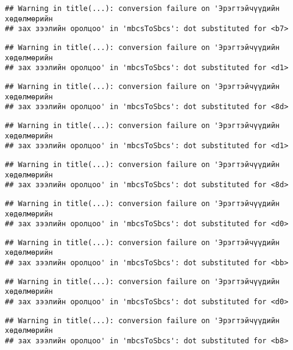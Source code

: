 \documentclass[]{article}
\begin{document}
\begin{verbatim}
## Warning in title(...): conversion failure on 'Эрэгтэйчүүдийн хөдөлмөрийн
## зах зээлийн оролцоо' in 'mbcsToSbcs': dot substituted for <b7>
\end{verbatim}

\begin{verbatim}
## Warning in title(...): conversion failure on 'Эрэгтэйчүүдийн хөдөлмөрийн
## зах зээлийн оролцоо' in 'mbcsToSbcs': dot substituted for <d1>
\end{verbatim}

\begin{verbatim}
## Warning in title(...): conversion failure on 'Эрэгтэйчүүдийн хөдөлмөрийн
## зах зээлийн оролцоо' in 'mbcsToSbcs': dot substituted for <8d>
\end{verbatim}

\begin{verbatim}
## Warning in title(...): conversion failure on 'Эрэгтэйчүүдийн хөдөлмөрийн
## зах зээлийн оролцоо' in 'mbcsToSbcs': dot substituted for <d1>
\end{verbatim}

\begin{verbatim}
## Warning in title(...): conversion failure on 'Эрэгтэйчүүдийн хөдөлмөрийн
## зах зээлийн оролцоо' in 'mbcsToSbcs': dot substituted for <8d>
\end{verbatim}

\begin{verbatim}
## Warning in title(...): conversion failure on 'Эрэгтэйчүүдийн хөдөлмөрийн
## зах зээлийн оролцоо' in 'mbcsToSbcs': dot substituted for <d0>
\end{verbatim}

\begin{verbatim}
## Warning in title(...): conversion failure on 'Эрэгтэйчүүдийн хөдөлмөрийн
## зах зээлийн оролцоо' in 'mbcsToSbcs': dot substituted for <bb>
\end{verbatim}

\begin{verbatim}
## Warning in title(...): conversion failure on 'Эрэгтэйчүүдийн хөдөлмөрийн
## зах зээлийн оролцоо' in 'mbcsToSbcs': dot substituted for <d0>
\end{verbatim}

\begin{verbatim}
## Warning in title(...): conversion failure on 'Эрэгтэйчүүдийн хөдөлмөрийн
## зах зээлийн оролцоо' in 'mbcsToSbcs': dot substituted for <b8>
\end{verbatim}
\end{document}
